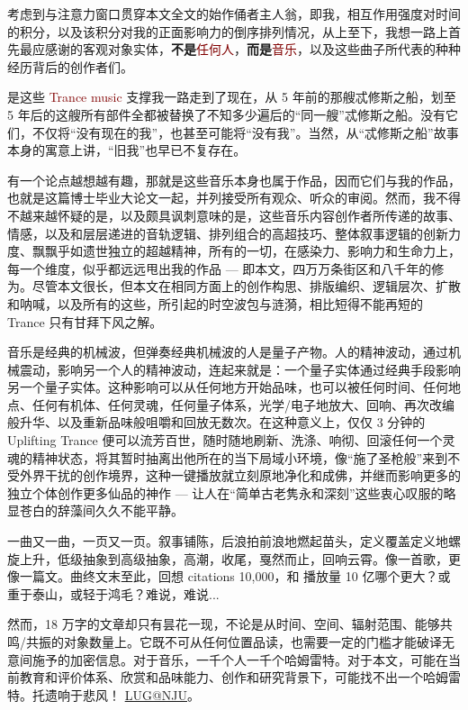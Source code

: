 \documentclass[
    type = doctor,
  ]{njuthesis}
\begin{document}
\begin{acknowledgement}
  考虑到与注意力窗口贯穿本文全文的始作俑者主人翁，即我，相互作用强度对时间的积分，以及该积分对我的正面影响力的倒序排列情况，从上至下，我想一路上首先最应感谢的客观对象实体，\textbf{不是}\textcolor{Maroon}{任何人}，\textbf{而是}\textcolor{Maroon}{音乐}，以及这些曲子所代表的种种经历背后的创作者们。
  
  是这些 \textcolor{Maroon}{Trance music} 支撑我一路走到了现在，从 5 年前的那艘忒修斯之船，划至 5 年后的这艘所有部件全都被替换了不知多少遍后的“同一艘”忒修斯之船。没有它们，不仅将“没有现在的我”，也甚至可能将“没有我”。当然，从“忒修斯之船”故事本身的寓意上讲，“旧我”也早已不复存在。
  
  有一个论点越想越有趣，那就是这些音乐本身也属于作品，因而它们与我的作品，也就是这篇博士毕业大论文一起，并列接受所有观众、听众的审阅。然而，我不得不越来越怀疑的是，以及颇具讽刺意味的是，这些音乐内容创作者所传递的故事、情感，以及和层层递进的音轨逻辑、排列组合的高超技巧、整体叙事逻辑的创新力度、飘飘乎如遗世独立的超越精神，所有的一切，在感染力、影响力和生命力上，每一个维度，似乎都远远甩出我的作品 --- 即本文，四万万条街区和八千年的修为。尽管本文很长，但本文在相同方面上的创作构思、排版编织、逻辑层次、扩散和呐喊，以及所有的这些，所引起的时空波包与涟漪，相比短得不能再短的 Trance 只有甘拜下风之解。
  
  音乐是经典的机械波，但弹奏经典机械波的人是量子产物。人的精神波动，通过机械震动，影响另一个人的精神波动，连起来就是：一个量子实体通过经典手段影响另一个量子实体。这种影响可以从任何地方开始品味，也可以被任何时间、任何地点、任何有机体、任何灵魂，任何量子体系，光学/电子地放大、回响、再次改编般升华、以及重新品味般咀嚼和回放无数次。在这种意义上，仅仅 3 分钟的 Uplifting Trance 便可以流芳百世，随时随地刷新、洗涤、响彻、回滚任何一个灵魂的精神状态，将其暂时抽离出他所在的当下局域小环境，像“施了圣枪般”来到不受外界干扰的创作境界，这种一键播放就立刻原地净化和成佛，并继而影响更多的独立个体创作更多仙品的神作 --- 让人在“简单古老隽永和深刻”这些衷心叹服的略显苍白的辞藻间久久不能平静。
  
  一曲又一曲，一页又一页。叙事铺陈，后浪拍前浪地燃起苗头，定义覆盖定义地螺旋上升，低级抽象到高级抽象，高潮，收尾，戛然而止，回响云霄。像一首歌，更像一篇文。曲终文末至此，回想 citations 10,000，和 播放量 10 亿哪个更大？或重于泰山，或轻于鸿毛？难说，难说...
  
  然而，18 万字的文章却只有昙花一现，不论是从时间、空间、辐射范围、能够共鸣/共振的对象数量上。它既不可从任何位置品读，也需要一定的门槛才能破译无意间施予的加密信息。对于音乐，一千个人一千个哈姆雷特。对于本文，可能在当前教育和评价体系、欣赏和品味能力、创作和研究背景下，可能找不出一个哈姆雷特。托遗响于悲风！
  \href{https://git.nju.edu.cn/nju-lug/lug-introduction}{LUG@NJU}。
\end{acknowledgement}
\end{document}

